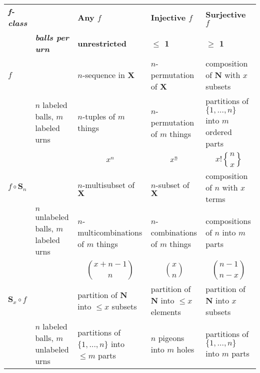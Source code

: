 \documentclass[]{article}
\newcommand{\fallingfactorial}[1]{%
  ^{\mspace{1mu}\underline{#1\mspace{-2mu}}\mspace{2mu}}%
}
\newcommand{\stirlingii}{\genfrac{\{}{\}}{0pt}{}}
\begin{document}
\begin{tabular}{ | p{.6in} | p{0.9in} || p{1.7in} | p{1.7in} | p{1.7in} |  }

\hline


\rowcolor{Gray} 
\textbf{\em{f}-class}
& 
& \textbf{Any $f$} 
&  \textbf{Injective $f$} 
& \textbf{Surjective $f$} 
\\

& \textbf{\em{balls per urn}} 
& \textbf{unrestricted} 
& \textbf{$\leq$ 1} 
& \textbf{$\geq$ 1} 
\\

\hline


\rowcolor{Gray} 
$f$
&
& $n$-sequence in $\mathbf{X}$
& $n$-permutation of $\mathbf{X}$
& composition of $\mathbf{N}$ with $x$ subsets
\\

& $n$ labeled balls, $m$ labeled urns
& $n$-tuples of $m$ things
& $n$-permutation of $m$ things
& partitions of $\{1,\ldots,n\}$ into $m$ ordered parts
\\

&
& $$x^n$$
& $$x\fallingfactorial{n}$$
& $$x! \stirlingii{n}{x}$$
\\

\hline


\rowcolor{Gray} 
$f \circ \mathbf{S}_n$
&
& $n$-multisubset of $\mathbf{X}$ 
& $n$-subset of $\mathbf{X}$ 
& composition of $n$ with $x$ terms
\\

& $n$ unlabeled balls, $m$ labeled urns
& $n$-multicombinations of $m$ things
& $n$-combinations of $m$ things
& compositions of $n$ into $m$ parts
\\

&
& $$\binom{x+n-1}{n}$$
& $$\binom{x}{n}$$
& $$\binom{n-1}{n-x}$$
\\

\hline


\rowcolor{Gray} 
$\mathbf{S}_x \circ f$
&
& partition of $\mathbf{N}$ into $\leq x$ subsets
& partition of $\mathbf{N}$ into $\leq x$ elements
& partition of $\mathbf{N}$ into $x$ subsets
\\

& $n$ labeled balls, $m$ unlabeled urns
& partitions of $\{1,\ldots,n\}$ into $\leq m$ parts
& $n$ pigeons into $m$ holes
& partitions of $\{1,\ldots,n\}$ into $m$ parts
\\


\end{tabular}
\end{document}

